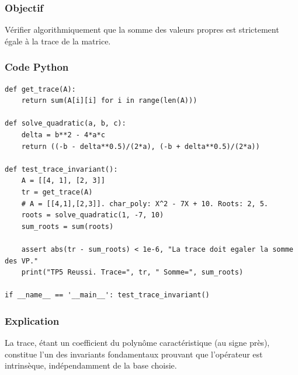 \documentclass[11pt,a4paper]{article}
\begin{document}
\subsubsection*{Objectif}
Vérifier algorithmiquement que la somme des valeurs propres est strictement égale à la trace de la matrice.

\subsubsection*{Code Python}
\begin{lstlisting}
def get_trace(A):
    return sum(A[i][i] for i in range(len(A)))

def solve_quadratic(a, b, c):
    delta = b**2 - 4*a*c
    return ((-b - delta**0.5)/(2*a), (-b + delta**0.5)/(2*a))

def test_trace_invariant():
    A = [[4, 1], [2, 3]]
    tr = get_trace(A)
    # A = [[4,1],[2,3]]. char_poly: X^2 - 7X + 10. Roots: 2, 5.
    roots = solve_quadratic(1, -7, 10)
    sum_roots = sum(roots)

    assert abs(tr - sum_roots) < 1e-6, "La trace doit egaler la somme des VP."
    print("TP5 Reussi. Trace=", tr, " Somme=", sum_roots)

if __name__ == '__main__': test_trace_invariant()
\end{lstlisting}
\subsubsection*{Explication}
La trace, étant un coefficient du polynôme caractéristique (au signe près), constitue l'un des invariants fondamentaux prouvant que l'opérateur est intrinsèque, indépendamment de la base choisie.
\end{document}
